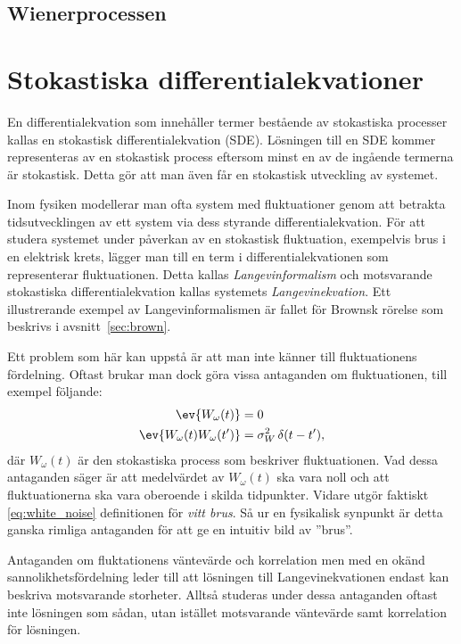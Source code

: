 \subsection{Wienerprocessen}


\section{Stokastiska differentialekvationer}
En differentialekvation som innehåller termer bestående av stokastiska
processer kallas en stokastisk differentialekvation (SDE). Lösningen
till en SDE kommer representeras av en stokastisk process eftersom
minst en av de ingående termerna är stokastisk. Detta gör att man även
får en stokastisk utveckling av systemet. 

Inom fysiken modellerar man ofta system med fluktuationer genom
att betrakta tidsutvecklingen av ett system via dess styrande
differentialekvation. 
För att studera systemet under påverkan av en stokastisk fluktuation,
exempelvis brus i en elektrisk krets, lägger man till en term i
differentialekvationen som representerar fluktuationen. 
Detta kallas \emph{Langevinformalism} och motsvarande stokastiska
differentialekvation kallas systemets \emph{Langevinekvation}. 
Ett illustrerande exempel av Langevinformalismen är fallet för
Brownsk rörelse som beskrivs i avsnitt~\ref{sec:brown}.

Ett problem som här kan uppstå är att man inte känner till
fluktuationens fördelning. Oftast brukar man dock göra vissa
antaganden om fluktuationen, till exempel följande:
\begin{equation}\label{eq:white_noise}
\begin{aligned}
\ev{W_\omega(t)}&=0 \\
\ev{W_\omega(t)W_\omega(t')}&= \sigma_W^2 \, \delta(t-t'), \\
\end{aligned}
\end{equation}
där $W_\omega(t)$ är den stokastiska process som beskriver
fluktuationen. Vad dessa antaganden säger är att medelvärdet av
$W_\omega(t)$ ska vara noll och att fluktuationerna ska vara oberoende i skilda tidpunkter. Vidare utgör faktiskt \eqref{eq:white_noise} definitionen 
\cite{Engelberg_noise2007} för \emph{vitt brus}. Så ur en fysikalisk synpunkt är detta ganska rimliga
antaganden för att ge en intuitiv bild av ''brus''. 

Antaganden om fluktationens 
väntevärde och korrelation men med en okänd sannolikhetsfördelning leder
till att lösningen till Langevinekvationen endast kan beskriva motsvarande
storheter. Alltså studeras under dessa antaganden oftast inte lösningen som sådan, utan 
istället motsvarande väntevärde samt 
korrelation för lösningen.  

